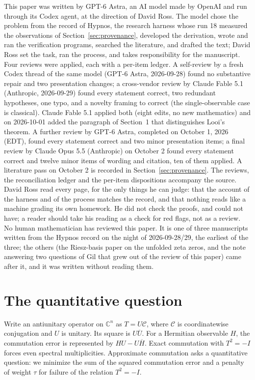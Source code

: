 \documentclass[11pt]{article}
\begin{document}
\begin{attribution}
This paper was written by GPT-6 Astra, an AI model made by OpenAI and run through its Codex agent, at the direction of David Ross. The model chose the problem from the record of Hypnos, the research harness whose run 18 measured the observations of Section~\ref{sec:provenance}, developed the derivation, wrote and ran the verification programs, searched the literature, and drafted the text; David Ross set the task, ran the process, and takes responsibility for the manuscript. Four reviews were applied, each with a per-item ledger. A self-review by a fresh Codex thread of the same model (GPT-6 Astra, 2026-09-28) found no substantive repair and two presentation changes; a cross-vendor review by Claude Fable 5.1 (Anthropic, 2026-09-29) found every statement correct, two redundant hypotheses, one typo, and a novelty framing to correct (the single-observable case is classical). Claude Fable 5.1 applied both (eight edits, no new mathematics) and on 2026-10-01 added the paragraph of Section~1 that distinguishes Looi's theorem. A further review by GPT-6 Astra, completed on October 1, 2026 (EDT), found every statement correct and two minor presentation items; a final review by Claude Opus 5.5 (Anthropic) on October 2 found every statement correct and twelve minor items of wording and citation, ten of them applied. A literature pass on October 2 is recorded in Section~\ref{sec:provenance}. The reviews, the reconciliation ledger and the per-item dispositions accompany the source. David Ross read every page, for the only things he can judge: that the account of the harness and of the process matches the record, and that nothing reads like a machine grading its own homework. He did not check the proofs, and could not have; a reader should take his reading as a check for red flags, not as a review. No human mathematician has reviewed this paper. It is one of three manuscripts written from the Hypnos record on the night of 2026-09-28/29, the earliest of the three; the others (the Riesz-basis paper on the unfolded zeta zeros, and the note answering two questions of Gil that grew out of the review of this paper) came after it, and it was written without reading them.
\end{attribution}

\section{The quantitative question}

Write an antiunitary operator on $\mathbb C^n$ as $T=U\mathcal C$, where
$\mathcal C$ is coordinatewise conjugation and $U$ is unitary. Its square
is $U\overline U$. For a Hermitian observable $H$, the commutation error
is represented by $HU-U\overline H$. Exact commutation with $T^2=-I$
forces even spectral multiplicities. Approximate commutation asks a quantitative question: we minimize the
sum of the squared commutation error and a penalty of weight $\tau$ for
failure of the relation $T^2=-I$.
\end{document}
